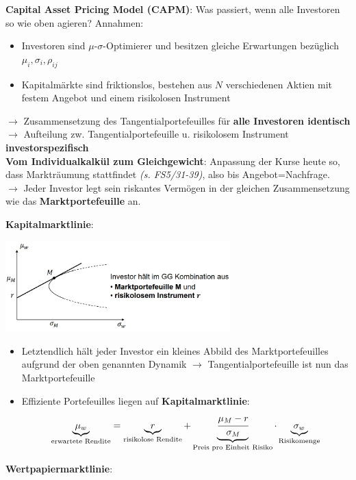 \bigskip
\textbf{Capital Asset Pricing Model (CAPM)}: Was passiert, wenn alle Investoren so wie oben agieren?
Annahmen:
\begin{itemize}
	\item Investoren sind $\mu\text{-}\sigma$-Optimierer und besitzen gleiche Erwartungen bezüglich $\mu_i,\sigma_i,\rho_{ij}$
	\item Kapitalmärkte sind friktionslos, bestehen aus $N$ verschiedenen Aktien mit festem Angebot und einem risikolosen Instrument
\end{itemize}
$\rightarrow$ Zusammensetzung des Tangentialportefeuilles für \textbf{alle Investoren identisch}\\
$\rightarrow$ Aufteilung zw. Tangentialportefeuille u. risikolosem Instrument \textbf{investorspezifisch}\\

\textbf{Vom Individualkalkül zum Gleichgewicht}:
Anpassung der Kurse heute so, dass Markträumung stattfindet \textit{(s. FS5/31-39)}, also bis Angebot=Nachfrage.\\
$\rightarrow$ Jeder Investor legt sein riskantes Vermögen in der gleichen Zusammensetzung wie das \textbf{Marktportefeuille} an.

\pagebreak
\textbf{Kapitalmarktlinie}: 
\begin{center}
	\includegraphics[width=0.65\textwidth]{images/marktpf.png}
\end{center}
\begin{itemize}
	\item Letztendlich hält jeder Investor ein kleines Abbild des Marktportefeuilles aufgrund der oben genannten Dynamik $\rightarrow$ Tangentialportefeuille ist nun das Marktportefeuille
	\item Effiziente Portefeuilles liegen auf \textbf{Kapitalmarktlinie}:
	\[
	\underbrace{\mu_w}_\text{erwartete Rendite}=
	\underbrace{r}_\text{risikolose Rendite} + 
	\underbrace{\cfrac{\mu_M-r}{\sigma_M}}_\text{Preis pro Einheit Risiko}\cdot
	\underbrace{\sigma_w}_\text{Risikomenge}
	\]
\end{itemize}

\textbf{Wertpapiermarktlinie}: